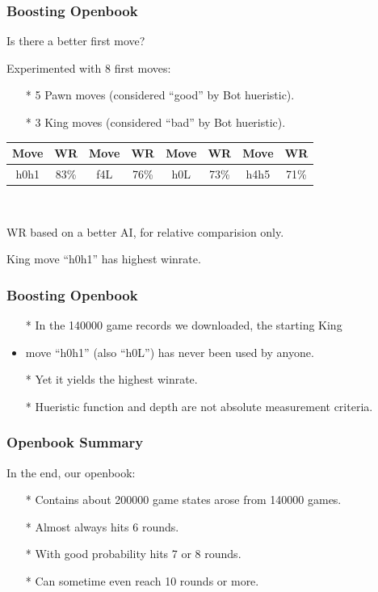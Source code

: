 \documentclass[10pt]{beamer}
\begin{document}
	\begin{frame}
		\frametitle{Boosting Openbook}
		
		Is there a better first move?\pause
		
		Experimented with 8 first moves:
		\begin{itemize}
		\item[*] \textcolor{fgreen}{5} Pawn moves (considered ``\textcolor{fgreen}{good}'' by Bot hueristic).
		\item[*] \textcolor{fgreen}{3} King moves (considered ``\textcolor{dred}{bad}'' by Bot hueristic).
		\end{itemize}
		\pause
		\begin{center}
\begin{tabular}{cc|cc|cc|cc}\hline\hline
Move & WR   & Move & WR   & Move & WR   & Move & WR   \\\hline
h0h1 & \textcolor{fgreen}{83\%} & f4L  & 76\% & h0L  & 73\% & h4h5 & 71\% \\\hline\hline
\end{tabular}

\

{\small WR based on a better AI, for relative comparision only.}
		\end{center}
		
		King move ``h0h1'' has highest winrate.
		
	\end{frame}
	
	\begin{frame}
		\frametitle{Boosting Openbook}
		
		\begin{itemize}
		\item[*] In the 140000 game records we downloaded, the starting King
		\item move ``h0h1'' (also ``h0L'') has never been used by anyone.\pause
		\item[*] Yet it yields the highest winrate. \pause
		\item[*] Hueristic function and depth are not absolute measurement criteria.
		\end{itemize}
		
	\end{frame}
	
	\begin{frame}
		\frametitle{Openbook Summary}

		In the end, our openbook:
		\begin{itemize}
		\item[*] Contains about \textcolor{fgreen}{200000} game states arose from \textcolor{fgreen}{140000} games.
		\item[*] Almost always hits \textcolor{fgreen}{6} rounds.
		\item[*] With good probability hits \textcolor{fgreen}{7} or \textcolor{fgreen}{8} rounds.
		\item[*] Can sometime even reach \textcolor{fgreen}{10} rounds or more.
		\end{itemize}
	\end{frame}
\end{document}
